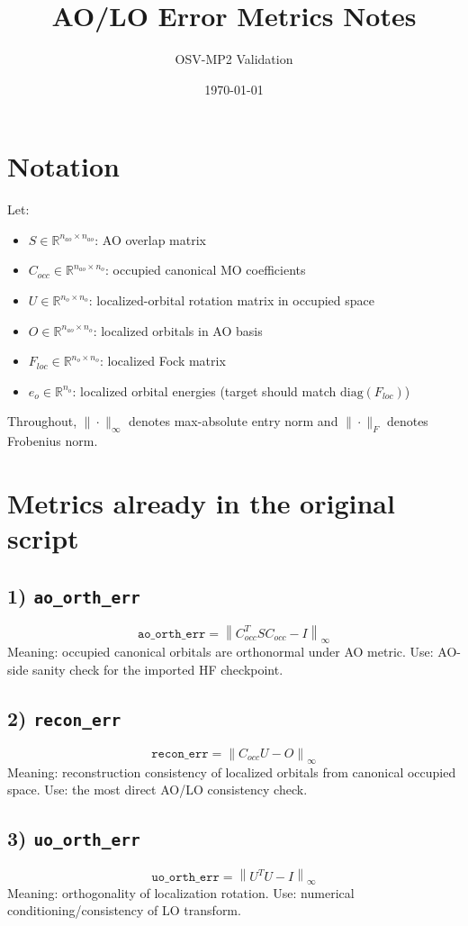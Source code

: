 \documentclass[11pt]{article}
\title{AO/LO Error Metrics Notes}
\author{OSV-MP2 Validation}
\date{\today}
\begin{document}
\maketitle

\section{Notation}
Let:
\begin{itemize}
  \item $S \in \mathbb{R}^{n_{ao}\times n_{ao}}$: AO overlap matrix
  \item $C_{occ} \in \mathbb{R}^{n_{ao}\times n_o}$: occupied canonical MO coefficients
  \item $U \in \mathbb{R}^{n_o\times n_o}$: localized-orbital rotation matrix in occupied space
  \item $O \in \mathbb{R}^{n_{ao}\times n_o}$: localized orbitals in AO basis
  \item $F_{loc} \in \mathbb{R}^{n_o\times n_o}$: localized Fock matrix
  \item $e_o \in \mathbb{R}^{n_o}$: localized orbital energies (target should match $\mathrm{diag}(F_{loc})$)
\end{itemize}

Throughout, $\|\cdot\|_\infty$ denotes max-absolute entry norm and $\|\cdot\|_F$ denotes Frobenius norm.

\section{Metrics already in the original script}
\subsection*{1) \texttt{ao\_orth\_err}}
\[
\texttt{ao\_orth\_err}=\left\|C_{occ}^T S C_{occ}-I\right\|_\infty
\]
Meaning: occupied canonical orbitals are orthonormal under AO metric.
Use: AO-side sanity check for the imported HF checkpoint.

\subsection*{2) \texttt{recon\_err}}
\[
\texttt{recon\_err}=\left\|C_{occ}U-O\right\|_\infty
\]
Meaning: reconstruction consistency of localized orbitals from canonical occupied space.
Use: the most direct AO/LO consistency check.

\subsection*{3) \texttt{uo\_orth\_err}}
\[
\texttt{uo\_orth\_err}=\left\|U^TU-I\right\|_\infty
\]
Meaning: orthogonality of localization rotation.
Use: numerical conditioning/consistency of LO transform.
\end{document}
